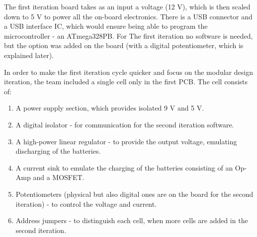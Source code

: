 The first iteration board takes as an input a voltage (12 V), which
is then scaled down to 5 V to power all the on-board electronics. 
There is a USB connector and a USB interface IC, which would ensure 
being able to program the microcontroller - an ATmega328PB. For The
first iteration no software is needed, but the option was added on the 
board (with a digital potentiometer, which is explained later).

In order to make the first iteration cycle quicker and focus on 
the modular design iteration, the team included a single cell 
only in the first PCB. The cell consists of:
\begin{enumerate}
    \item A power supply section, which provides isolated 9 V and 5 V.
    \item A digital isolator - for communication for the second 
    iteration software.
    \item A high-power linear regulator - to provide the output 
    voltage, emulating discharging of the batteries.
    \item A current sink to emulate the charging of the batteries 
    consisting of an Op-Amp and a MOSFET.
    \item Potentiometers (physical but also digital ones are on 
    the board for the second iteration) - to control the voltage
    and current.
    \item Address jumpers - to distinguish each cell, when more 
    cells are added in the second iteration.
\end{enumerate}
